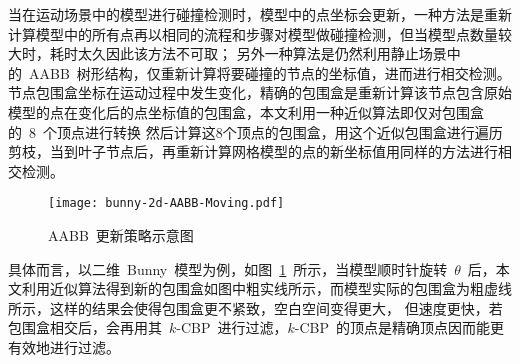 当在运动场景中的模型进行碰撞检测时，模型中的点坐标会更新，一种方法是重新计算模型中的所有点再以相同的流程和步骤对模型做碰撞检测，但当模型点数量较大时，耗时太久因此该方法不可取；
另外一种算法是仍然利用静止场景中的~AABB~树形结构，仅重新计算将要碰撞的节点的坐标值，进而进行相交检测。
节点包围盒坐标在运动过程中发生变化，精确的包围盒是重新计算该节点包含原始模型的点在变化后的点坐标值的包围盒，本文利用一种近似算法即仅对包围盒的~8~个顶点进行转换
然后计算这8个顶点的包围盒，用这个近似包围盒进行遍历剪枝，当到叶子节点后，再重新计算网格模型的点的新坐标值用同样的方法进行相交检测。

\begin{figure}[htbp]
  \centering
  \texttt{[image: bunny-2d-AABB-Moving.pdf]}
  \caption{AABB~更新策略示意图}
  \label{fig:bunny:moving}
\end{figure}

具体而言，以二维~Bunny~模型为例，如图~\ref{fig:bunny:moving}~所示，当模型顺时针旋转~$\theta$~后，本文利用近似算法得到新的包围盒如图中粗实线所示，而模型实际的包围盒为粗虚线所示，这样的结果会使得包围盒更不紧致，空白空间变得更大，
但速度更快，若包围盒相交后，会再用其~$k$-CBP~进行过滤，$k$-CBP~的顶点是精确顶点因而能更有效地进行过滤。

